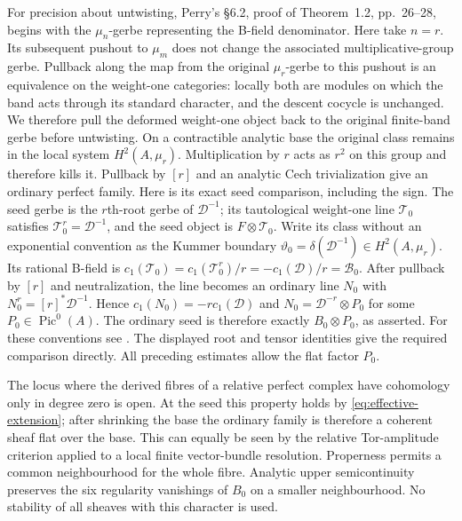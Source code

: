 For precision about untwisting, Perry's \S6.2, proof of Theorem~1.2, pp.~26--28, begins with the $\mu_n$-gerbe representing
the B-field denominator. Here take $n=r$. Its subsequent pushout
to $\mu_m$ does not change the associated multiplicative-group gerbe. Pullback along the map from the original $\mu_r$-gerbe to this pushout is an equivalence on the weight-one categories: locally both are modules on which the band acts through its standard character, and the descent cocycle is unchanged. We therefore pull the deformed weight-one object back to the original finite-band gerbe before untwisting. On a
contractible analytic base the original class remains in the
local system $H^2(A,\mu_r)$. Multiplication by $r$ acts as
$r^2$ on this group and therefore kills it. Pullback by $[r]$
and an analytic Cech trivialization give an ordinary perfect
family. Here is its exact seed comparison, including the sign.
The seed gerbe is the $r$th-root gerbe of $\mathcal D^{-1}$;
its tautological weight-one line $\mathcal T_0$ satisfies
$\mathcal T_0^r=\mathcal D^{-1}$, and the seed object is
$F\otimes\mathcal T_0$. Write its class without an exponential
convention as the Kummer boundary
$\vartheta_0=\delta(\mathcal D^{-1})\in H^2(A,\mu_r)$.
Its rational B-field is
$c_1(\mathcal T_0)=c_1(\mathcal T_0^r)/r
=-c_1(\mathcal D)/r=\mathcal B_0$.
After pullback by $[r]$ and neutralization, the line becomes
an ordinary line $N_0$ with
$N_0^r=[r]^*\mathcal D^{-1}$. Hence
$c_1(N_0)=-r c_1(\mathcal D)$ and
$N_0=\mathcal D^{-r}\otimes P_0$ for some
$P_0\in\operatorname{Pic}^0(A)$. The ordinary seed is therefore
exactly $B_0\otimes P_0$, as asserted.
For these conventions see \cite[Definition~4.5, Lemma~4.6, Remark~4.13, Definition~4.16 and Theorem~4.17, author pp.~15--18]{Hotchkiss}. The displayed root and tensor identities give the required
comparison directly. All preceding estimates allow the flat
factor $P_0$.

The locus where the derived fibres of a relative perfect
complex have cohomology only in degree zero is open. At the
seed this property holds by \eqref{eq:effective-extension}; after shrinking the base
the ordinary family is therefore a coherent sheaf flat over
the base. This can equally be seen by the relative Tor-amplitude
criterion applied to a local finite vector-bundle resolution.
Properness permits a common neighbourhood for the whole fibre.
Analytic upper semicontinuity preserves the six regularity
vanishings of $B_0$ on a smaller neighbourhood. No stability
of all sheaves with this character is used.

